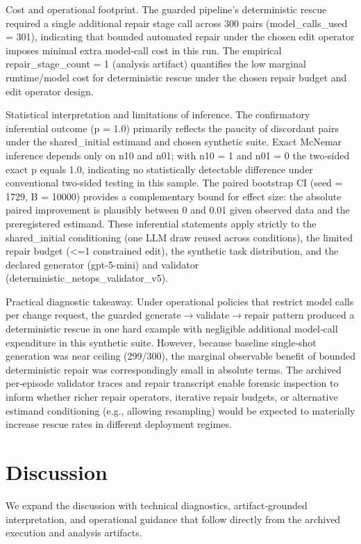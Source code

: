 \documentclass[conference]{IEEEtran}
\begin{document}
Cost and operational footprint. The guarded pipeline's deterministic rescue required a single additional repair stage call across 300 pairs (model\_calls\_used = 301), indicating that bounded automated repair under the chosen edit operator imposes minimal extra model‑call cost in this run. The empirical repair\_stage\_count = 1 (analysis artifact) quantifies the low marginal runtime/model cost for deterministic rescue under the chosen repair budget and edit operator design.

Statistical interpretation and limitations of inference. The confirmatory inferential outcome (p = 1.0) primarily reflects the paucity of discordant pairs under the shared\_initial estimand and chosen synthetic suite. Exact McNemar inference depends only on n10 and n01; with n10 = 1 and n01 = 0 the two‑sided exact p equals 1.0, indicating no statistically detectable difference under conventional two‑sided testing in this sample. The paired bootstrap CI (seed = 1729, B = 10000) provides a complementary bound for effect size: the absolute paired improvement is plausibly between 0 and 0.01 given observed data and the preregistered estimand. These inferential statements apply strictly to the shared\_initial conditioning (one LLM draw reused across conditions), the limited repair budget (<=1 constrained edit), the synthetic task distribution, and the declared generator (gpt-5-mini) and validator (deterministic\_netops\_validator\_v5).

Practical diagnostic takeaway. Under operational policies that restrict model calls per change request, the guarded generate\ensuremath{\rightarrow}validate\ensuremath{\rightarrow}repair pattern produced a deterministic rescue in one hard example with negligible additional model‑call expenditure in this synthetic suite. However, because baseline single‑shot generation was near ceiling (299/300), the marginal observable benefit of bounded deterministic repair was correspondingly small in absolute terms. The archived per‑episode validator traces and repair transcript enable forensic inspection to inform whether richer repair operators, iterative repair budgets, or alternative estimand conditioning (e.g., allowing resampling) would be expected to materially increase rescue rates in different deployment regimes.

\section{Discussion}
We expand the discussion with technical diagnostics, artifact‑grounded interpretation, and operational guidance that follow directly from the archived execution and analysis artifacts.
\end{document}
